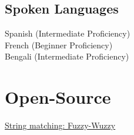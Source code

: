 \documentclass[]{deedy-resume-openfont}
\begin{document}
\begin{minipage}[t]{0.31\textwidth}
\subsection{Spoken Languages}
Spanish (Intermediate Proficiency) \\
French (Beginner Proficiency)\\
Bengali (Intermediate Proficiency)
\\[1\baselineskip]

\section{Open-Source}
\textbullet{} \color{cyan}\underline{\color{cyan}\href{https://github.com/seatgeek/fuzzywuzzy}{\color{cyan}String matching: Fuzzy-Wuzzy}}

%
%

\end{minipage} 
\hfill
\end{document}

